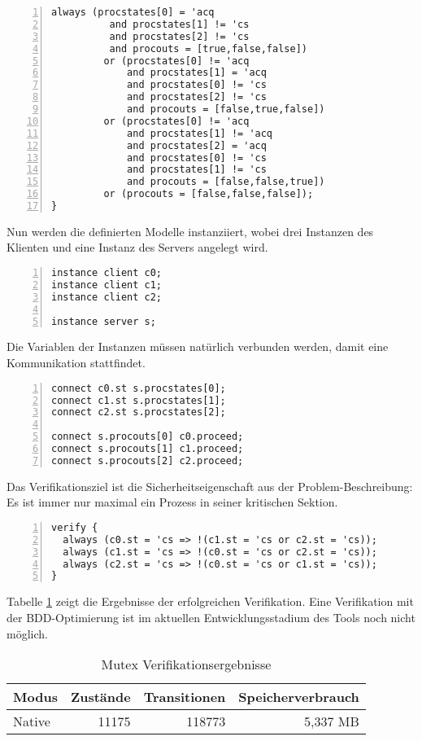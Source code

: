 \begin{lstlisting}[language=gtl,numbers=left,firstnumber=last]
  always (procstates[0] = 'acq
          and procstates[1] != 'cs
          and procstates[2] != 'cs
          and procouts = [true,false,false])
         or (procstates[0] != 'acq 
             and procstates[1] = 'acq
             and procstates[0] != 'cs
             and procstates[2] != 'cs
             and procouts = [false,true,false])
         or (procstates[0] != 'acq
             and procstates[1] != 'acq
             and procstates[2] = 'acq
             and procstates[0] != 'cs
             and procstates[1] != 'cs
             and procouts = [false,false,true])
         or (procouts = [false,false,false]);
}
\end{lstlisting}
Nun werden die definierten Modelle instanziiert, wobei drei Instanzen des Klienten und eine Instanz des Servers angelegt wird.
\begin{lstlisting}[language=gtl,numbers=left,firstnumber=last,caption={Mutex Instanzen}]
instance client c0;
instance client c1;
instance client c2;

instance server s;
\end{lstlisting}
Die Variablen der Instanzen müssen natürlich verbunden werden, damit eine Kommunikation stattfindet.
\begin{lstlisting}[language=gtl,numbers=left,firstnumber=last,caption={Mutex Verbindungen}]
connect c0.st s.procstates[0];
connect c1.st s.procstates[1];
connect c2.st s.procstates[2];

connect s.procouts[0] c0.proceed;
connect s.procouts[1] c1.proceed;
connect s.procouts[2] c2.proceed;
\end{lstlisting}
Das Verifikationsziel ist die Sicherheitseigenschaft aus der Problem-Beschreibung:
Es ist immer nur maximal ein Prozess in seiner kritischen Sektion.
\begin{lstlisting}[language=gtl,numbers=left,firstnumber=last,caption={Mutex Verifikationsziel}]
verify {
  always (c0.st = 'cs => !(c1.st = 'cs or c2.st = 'cs));
  always (c1.st = 'cs => !(c0.st = 'cs or c2.st = 'cs));
  always (c2.st = 'cs => !(c0.st = 'cs or c1.st = 'cs));
}
\end{lstlisting}
Tabelle \ref{tab:mutex_results} zeigt die Ergebnisse der erfolgreichen Verifikation.
Eine Verifikation mit der BDD-Optimierung ist im aktuellen Entwicklungsstadium des Tools noch nicht möglich.
\begin{table}
  \centering
  \begin{tabular}{|l|r|r|r|}
    \hline
    \textbf{Modus} & \textbf{Zustände} & \textbf{Transitionen} & \textbf{Speicherverbrauch}\\
    \hline
    Native & 11175 & 118773 & 5,337 MB\\
    \hline
  \end{tabular}
  \caption{Mutex Verifikationsergebnisse}
  \label{tab:mutex_results}
\end{table}


